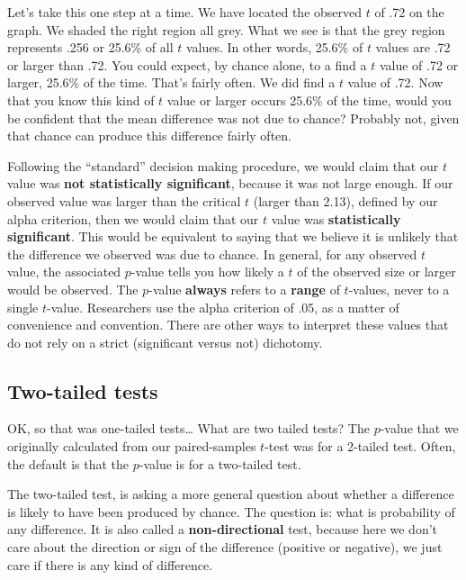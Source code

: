 \documentclass[
  letterpaper,
  DIV=11,
  numbers=noendperiod]{scrreprt}
\begin{document}
Let's take this one step at a time. We have located the observed \(t\)
of .72 on the graph. We shaded the right region all grey. What we see is
that the grey region represents .256 or 25.6\% of all \(t\) values. In
other words, 25.6\% of \(t\) values are .72 or larger than .72. You
could expect, by chance alone, to a find a \(t\) value of .72 or larger,
25.6\% of the time. That's fairly often. We did find a \(t\) value of
.72. Now that you know this kind of \(t\) value or larger occurs 25.6\%
of the time, would you be confident that the mean difference was not due
to chance? Probably not, given that chance can produce this difference
fairly often.

Following the ``standard'' decision making procedure, we would claim
that our \(t\) value was \textbf{not statistically significant}, because
it was not large enough. If our observed value was larger than the
critical \(t\) (larger than 2.13), defined by our alpha criterion, then
we would claim that our \(t\) value was \textbf{statistically
significant}. This would be equivalent to saying that we believe it is
unlikely that the difference we observed was due to chance. In general,
for any observed \(t\) value, the associated \(p\)-value tells you how
likely a \(t\) of the observed size or larger would be observed. The
\(p\)-value \textbf{always} refers to a \textbf{range} of \(t\)-values,
never to a single \(t\)-value. Researchers use the alpha criterion of
.05, as a matter of convenience and convention. There are other ways to
interpret these values that do not rely on a strict (significant versus
not) dichotomy.

\subsection{Two-tailed tests}\label{two-tailed-tests}

OK, so that was one-tailed tests\ldots{} What are two tailed tests? The
\(p\)-value that we originally calculated from our paired-samples
\(t\)-test was for a 2-tailed test. Often, the default is that the
\(p\)-value is for a two-tailed test.

The two-tailed test, is asking a more general question about whether a
difference is likely to have been produced by chance. The question is:
what is probability of any difference. It is also called a
\textbf{non-directional} test, because here we don't care about the
direction or sign of the difference (positive or negative), we just care
if there is any kind of difference.
\end{document}
